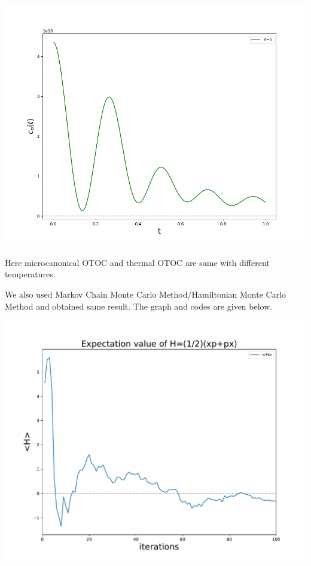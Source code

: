 \documentclass[12pt]{report}
\newcommand*{\1}{\hspace{1pt}}
\begin{document}
        \begin{adjustbox}{center,caption={},label={microcanocnial OTOC},nofloat=figure,}
            \includegraphics[width=\textwidth]{pic2}
        \end{adjustbox}

        Here microcanonical OTOC and thermal OTOC are same with different temperatures.

        
        
        We also used Markov Chain Monte Carlo Method/Hamiltonian Monte Carlo Method \cite{s37,s38} and obtained same result. The graph and codes are given below.


        \begin{adjustbox}{center,caption={},label={},nofloat=figure,}
            \includegraphics[width=\textwidth]{plot}
        \end{adjustbox}
\end{document}
